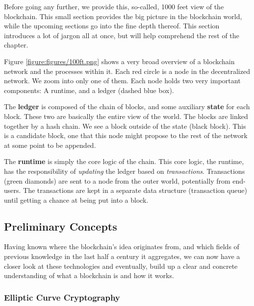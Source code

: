 Before going any further, we provide this, so-called, 1000 feet view of the blockchain. This small
section provides the big picture in the blockchain world, while the upcoming sections go into the
fine depth thereof. This section introduces a lot of jargon all at once, but will help comprehend
the rest of the chapter.

Figure \ref{figure:figures/100ft.png} shows a very broad overview of a blockchain network and the
processes within it. Each red circle is a node in the decentralized network. We zoom into only one
of them. Each node holds two very important components: A runtime, and a ledger (dashed blue box).

The \textbf{ledger} is composed of the chain of blocks, and some auxiliary \textbf{state} for each
block. These two are basically the entire view of the world. The blocks are linked together by a
hash chain. We see a block outside of the state (black block). This is a candidate block, one that
this node might propose to the rest of the network at some point to be appended.

The \textbf{runtime} is simply the core logic of the chain. This core logic, the runtime, has the
responsibility of \textit{updating} the ledger based on \textit{transactions}. Transactions (green
diamonds) are sent to a node from the outer world, potentially from end-users. The transactions are
kept in a separate data structure (transaction queue) until getting a chance at being put into a
block.

\subsection{Preliminary Concepts} \label{chap_bg:sec:preliminary}

Having known where the blockchain's idea originates from, and which fields of previous knowledge in
the last half a century it aggregates, we can now have a closer look at these technologies and
eventually, build up a clear and concrete understanding of what a blockchain is and how it works.

\subsubsection{Elliptic Curve Cryptography} \label{chap_bg:subsec:ecc}

